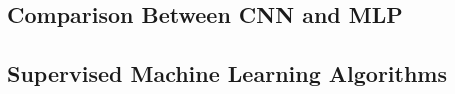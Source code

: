 \documentclass[
	article, %
	11pt, %
	draft, %
]{CSUniSchoolLabReport}
\begin{document}



\subsection{Comparison Between CNN and MLP}\label{cnn_vs_mlp}

\subsection{Supervised Machine Learning Algorithms}\label{sml}

\end{document}
